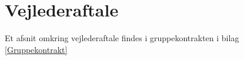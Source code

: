 \section{Vejlederaftale}
Et afsnit omkring vejlederaftale findes i gruppekontrakten i bilag \ref{Gruppekontrakt}